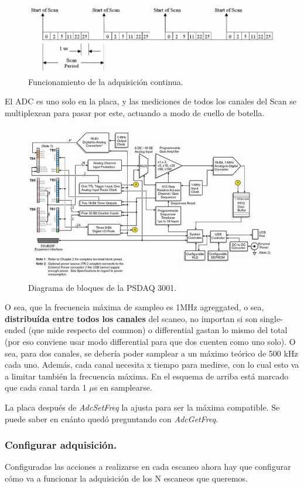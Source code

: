 \begin{figure}[th!]
	\centering
	\includegraphics[width=0.567\linewidth]{Figures/09_06_2025/Tiempos_scan}
	\caption{Funcionamiento de la adquisición continua.}
	\label{fig:tiemposscan}
\end{figure}

El ADC es uno solo en la placa, y las mediciones de todos los canales del Scan se multiplexean para pasar por este, actuando a modo de cuello de botella. 

\begin{figure}[th!]
	\centering
	\includegraphics[width=0.5157146\linewidth]{Figures/09_06_2025/Diagrama_bloques_DAQ3000}
	\caption{Diagrama de bloques de la PSDAQ 3001.}
	\label{fig:diagramabloquesdaq3000}
\end{figure}

O sea, que la frecuencia máxima de sampleo es 1MHz agreggated, o sea, \textbf{distribuída entre todos los canales} del scaneo, no importan si son single-ended (que mide respecto del common) o differential gastan lo mismo del total (por eso conviene usar modo differential para que dos cuenten como uno solo). O sea, para dos canales, se debería poder samplear a un máximo teórico de 500 kHz cada uno. Además, cada canal necesita x tiempo para medirse, con lo cual esto va a limitar también la frecuencia máxima. En el esquema de arriba está marcado que cada canal tarda 1 $\mu$s en samplearse.

La placa después de \textit{AdcSetFreq} la ajusta para ser la máxima compatible. Se puede saber en cuánto quedó preguntando con \textit{AdcGetFreq}. 

\subsubsection*{Configurar adquisición.}
Configuradas las acciones a realizarse en cada escaneo ahora hay que configurar cómo va a funcionar la adquisición de los N escaneos que queremos. 

